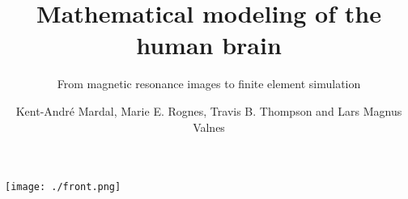 \documentclass[graybox,envcountchap]{svmono}
\begin{document}
\author{Kent-Andr\'e Mardal, Marie E. Rognes, Travis B. Thompson and Lars Magnus Valnes}
\title{Mathematical modeling of the human brain}
\subtitle{From magnetic resonance images to finite element simulation}
\maketitle

\texttt{[image: ./front.png]}
\frontmatter%
%


%

\setcounter{tocdepth}{1}
\tableofcontents

%

\mainmatter%
%













\newpage

%

\backmatter%
%
%
\printindex





\end{document}
